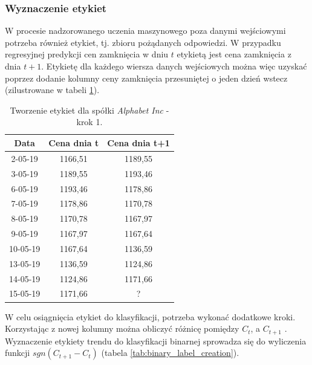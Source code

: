 \documentclass[a4paper, twoside, 11pt, openright]{article}
\begin{document}
\subsubsection{Wyznaczenie etykiet}

W procesie nadzorowanego uczenia maszynowego poza danymi wejściowymi potrzeba również etykiet, tj. zbioru pożądanych odpowiedzi. W przypadku regresyjnej predykcji cen zamknięcia w dniu $t$ etykietą jest cena zamknięcia z dnia $t+1$. Etykietę dla każdego wiersza danych wejściowych można więc uzyskać poprzez dodanie kolumny ceny zamknięcia przesuniętej o jeden dzień wstecz (zilustrowane w tabeli \ref{tab:regression_label_creation}). 

 \begin{table}[H]
    \centering
    \begin{tabular}{|c|c|c|}
    \hline
        \textbf{Data}  & \textbf{Cena dnia t} & \textbf{Cena dnia t+1}\\ \hline
            2-05-19 & 1166,51 & 1189,55 \\ \hline
            3-05-19 & 1189,55 & 1193,46 \\ \hline 
            6-05-19 & 1193,46 & 1178,86 \\ \hline 
            7-05-19 & 1178,86 & 1170,78 \\ \hline 
            8-05-19 & 1170,78 & 1167,97 \\ \hline 
            9-05-19 & 1167,97 & 1167,64 \\ \hline 
            10-05-19 & 1167,64 & 1136,59 \\ \hline 
            13-05-19 & 1136,59 & 1124,86 \\ \hline 
            14-05-19 & 1124,86 & 1171,66 \\ \hline 
            15-05-19 & 1171,66 & ? \\ \hline 
    \end{tabular}
    \caption{Tworzenie etykiet dla spółki \textit{Alphabet Inc} - krok 1.}
    \label{tab:regression_label_creation}
\end{table} 

W celu osiągnięcia etykiet do klasyfikacji, potrzeba wykonać dodatkowe kroki. Korzystając z nowej kolumny można obliczyć różnicę pomiędzy $C_t$, a $C_{t+1}$ . Wyznaczenie etykiety trendu do klasyfikacji binarnej sprowadza się do wyliczenia funkcji $sgn(C_{t+1}-C_{t})$ (tabela \ref{tab:binary_label_creation}). 
\end{document}

